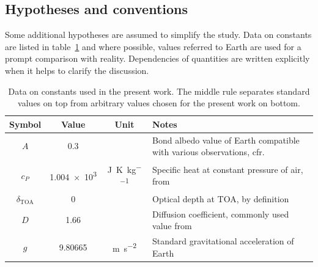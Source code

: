 \documentclass[a4paper,10pt,twocolumn,\classoptions]{article}
\newcommand{\deltaTOA}{\delta_\text{TOA}}
\begin{document}
\subsection{Hypotheses and conventions}
\label{sec:Hypotheses and conventions}
Some additional hypotheses are assumed to simplify the study. Data on constants are listed in table~\ref{tab:constants} and where possible, values referred to Earth are used for a prompt comparison with reality. Dependencies of quantities are written explicitly when it helps to clarify the discussion.
\begin{table}[h]
  \centering
  \caption{Data on constants used in the present work. The middle rule separates standard values on top from arbitrary values chosen for the present work on bottom.}
  \label{tab:constants}
  \begin{tabular}[b]{cccp{}}
    \toprule
    Symbol            & Value                                                                  & Unit                                              & \centering Notes                                                                          \tabularnewline
    \midrule
    $A$               & \num{0.3}                                                              &                                                   & Bond albedo value of Earth compatible with various observations, cfr. \cite[1281]{albedo} \\
    $c_P$             & \num{1.004e3}                                                          & \unit{\joule\per\kelvin\per\kilogram}             & Specific heat at constant pressure of air, from \cite[16]{Catling}                        \\
    $\deltaTOA$       & \num{0}                                                                &                                                   & Optical depth at TOA, by definition                                                       \\
    $D$               & \num{1.66}                                                             &                                                   & Diffusion coefficient, commonly used value from \cite[55]{Catling}                        \\
    $g$               & \num{9.80665}                                                          & \unit{\metre\per\square\second}                   & Standard gravitational acceleration of Earth                                              \\

\end{tabular}
\end{table}
\end{document}
